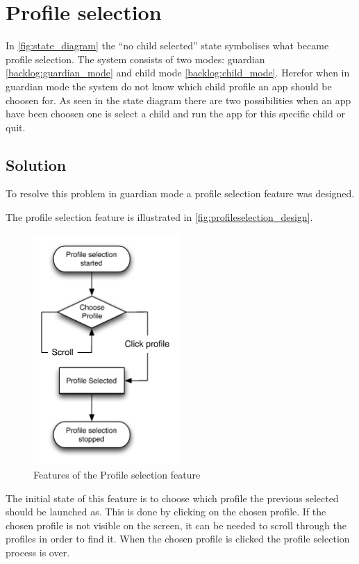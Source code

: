 \section{Profile selection}
\label{design:profile_selection}
In \autoref{fig:state_diagram} the ``no child selected'' state symbolises what became profile selection. The \giraf[] system consists of two modes: guardian \autoref{backlog:guardian_mode} and child mode \autoref{backlog:child_mode}. Herefor when in guardian mode the system do not know which child profile an app should be choosen for. As seen in the state diagram there are two possibilities when an app have been choosen one is select a child and run the app for this specific child or quit.

\subsection{Solution}

To resolve this problem in guardian mode a profile selection feature was designed.

The profile selection feature is illustrated in \autoref{fig:profileselection_design}. 
\label{design:profile_selection}
\begin{figure}[h]
	\centering
	\includegraphics[width=0.5\textwidth]{gfx/profileselect_design.pdf}
	\caption{Features of the Profile selection feature}
	\label{fig:profileselection_design}
\end{figure}

The initial state of this feature is to choose which profile the previous selected should be launched as. This is done by clicking on the chosen profile. If the chosen profile is not visible on the screen, it can be needed to scroll through the profiles in order to find it. When the chosen profile is clicked the profile selection process is over.